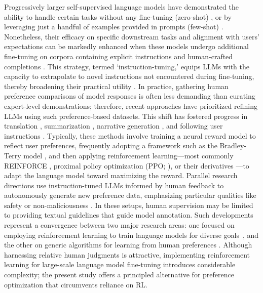Progressively larger self-supervised language models have demonstrated the ability to handle certain tasks without any fine-tuning (zero-shot) \citep{radford2019language}, or by leveraging just a handful of examples provided in prompts (few-shot) \citep{gpt3,megatron,chowdhery2022palm}. Nonetheless, their efficacy on specific downstream tasks and alignment with users’ expectations can be markedly enhanced when these models undergo additional fine-tuning on corpora containing explicit instructions and human-crafted completions \citep{mishra-etal-2022-cross,sanh2022multitask,chung2022scaling,thoppilan2022lamda}. This strategy, termed `instruction-tuning,’ equips LLMs with the capacity to extrapolate to novel instructions not encountered during fine-tuning, thereby broadening their practical utility \citep{chung2022scaling}. In practice, gathering human preference comparisons of model responses is often less demanding than curating expert-level demonstrations; therefore, recent approaches have prioritized refining LLMs using such preference-based datasets. This shift has fostered progress in translation \citep{kreutzer-etal-2018-reliability}, summarization \citep{stiennon2022learning,ziegler2020finetuning}, narrative generation \citep{ziegler2020finetuning}, and following user instructions \citep{ouyang2022training,ramamurthy2023is}. Typically, these methods involve training a neural reward model to reflect user preferences, frequently adopting a framework such as the Bradley-Terry model \citep{bradley1952rankanalysis}, and then applying reinforcement learning—most commonly REINFORCE \citep{williams1992reinforce}, proximal policy optimization (PPO; \cite{schulman2017proximal}), or their derivatives \citep{ramamurthy2023is}—to adapt the language model toward maximizing the reward. Parallel research directions use instruction-tuned LLMs informed by human feedback to autonomously generate new preference data, emphasizing particular qualities like safety or non-maliciousness \citep{bai2022constitutional}. In these setups, human supervision may be limited to providing textual guidelines that guide model annotation. Such developments represent a convergence between two major research areas: one focused on employing reinforcement learning to train language models for diverse goals~\citep{Ranzato2015SequenceLT,paulus2018a,wu2018learning}, and the other on generic algorithms for learning from human preferences \citep{christiano2017deep,kupcsik2018learning}. Although harnessing relative human judgments is attractive, implementing reinforcement learning for large-scale language model fine-tuning introduces considerable complexity; the present study offers a principled alternative for preference optimization that circumvents reliance on RL.

